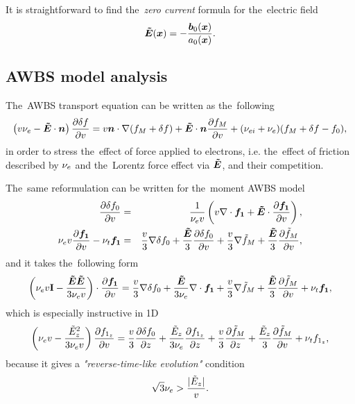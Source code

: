 It is straightforward to find the~\textit{zero current} formula for 
the~electric field
\begin{equation}
  \boldsymbol{\tilde{E}}(\boldsymbol{x}) = -\frac{\boldsymbol{b}_{0}(\boldsymbol{x})}{a_{0}(\boldsymbol{x})} .
  \label{eq:OOE_E_j0}
\end{equation}

\subsection{AWBS model analysis}
\label{sec:OOE_AWBS_model_analysis}
The~AWBS transport equation can be written as the~following
\begin{multline}
  \left(v \nu_{e} - \boldsymbol{\tilde{E}}\cdot\boldsymbol{n}\right)\frac{\partial{\delta f}}{\partial{v}} 
  =
  v\boldsymbol{n}\cdot\nabla (f_M + \delta f) + \boldsymbol{\tilde{E}}\cdot\boldsymbol{n}\frac{\partial{f_M}}{\partial{v}} 
  + (\nu_{ei} + \nu_{e}) (f_M + \delta f - f_0) ,
  \label{eq:OOE_AWBS_model_analysis}
\end{multline}
in order to stress the~effect of force applied to electrons, i.e. the~effect
of friction described by $\nu_{e}$ and the~Lorentz force effect via $\boldsymbol{\tilde{E}}$, 
and their competition.

The~same reformulation can be written for the~moment AWBS model
\begin{eqnarray}
  \frac{\partial{\delta f_0}}{\partial{v}} &=&
  \frac{1}{\nu_{e}v}\left(v\nabla\cdot{\boldsymbol{f_1}} + \boldsymbol{\tilde{E}}\cdot
  \frac{\partial{{\boldsymbol{f_1}}}}{\partial{v}}\right) , 
  \nonumber\\
  \nu_{e}v\frac{\partial{{\boldsymbol{f_1}}}}{\partial{v}} - \nu_{t}{\boldsymbol{f_1}} &=& 
  \frac{v}{3}\nabla\delta f_0 + 
  \frac{\boldsymbol{\tilde{E}}}{3}\frac{\partial{\delta f_0}}{\partial{v}}
  + \frac{v}{3}\nabla\tilde{f}_M + \frac{\boldsymbol{\tilde{E}}}{3}\frac{\partial{\tilde{f}_M}}{\partial{v}} ,
  \nonumber
\end{eqnarray}
and it takes the~following form
\begin{equation}
  \left(\nu_{e}v\mathbf{I} - \frac{\boldsymbol{\tilde{E}}\boldsymbol{\tilde{E}}}{3 \nu_{e}v}\right)\cdot
  \frac{\partial{{\boldsymbol{f_1}}}}{\partial{v}} = 
  \frac{v}{3}\nabla\delta f_0 + \frac{\boldsymbol{\tilde{E}}}{3 \nu_{e}}\nabla\cdot{\boldsymbol{f_1}}
  + \frac{v}{3}\nabla\tilde{f}_M + \frac{\boldsymbol{\tilde{E}}}{3}\frac{\partial{\tilde{f}_M}}{\partial{v}} 
  + \nu_{t}{\boldsymbol{f_1}} ,
  \nonumber \label{eq:OOE_P1AWBS_model_analysis}
\end{equation}
which is especially instructive in 1D
\begin{equation}
  \left(\nu_{e}v - \frac{\tilde{E}_z^2}{3 \nu_{e}v}\right)
  \frac{\partial{f_{1_z}}}{\partial{v}} = 
  \frac{v}{3}\frac{\partial{\delta f_0}}{\partial{z}} + \frac{\tilde{E}_z}{3 \nu_{e}}\frac{\partial{f_{1_z}}}{\partial{z}}
  + \frac{v}{3}\frac{\partial{\tilde{f}_M}}{\partial{z}} + \frac{\tilde{E}_z}{3}\frac{\partial{\tilde{f}_M}}{\partial{v}} 
  + \nu_{t}f_{1_z} ,
  \label{eq:OOE_P1AWBS_model_1Danalysis}
\end{equation}
because it gives a \textit{"reverse-time-like evolution"} condition
\begin{equation}
  \sqrt{3} \nu_{e} > \frac{|\tilde{E}_z|}{v} .
  \label{eq:OOE_reverse_time_condition}
\end{equation}

